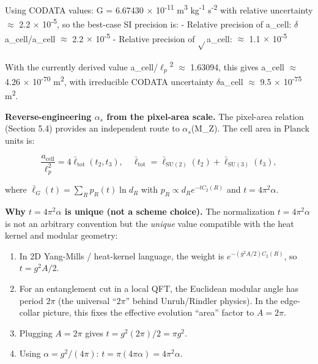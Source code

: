 \documentclass[11pt,a4paper]{article}
\theoremstyle{remark}
\begin{document}
Using CODATA values: G = 6.67430 \ensuremath{\times} 10\textsuperscript{-11} m\textsuperscript{3} kg\textsuperscript{-1} s\textsuperscript{-2} with relative uncertainty \ensuremath{\approx} 2.2 \ensuremath{\times} 10\textsuperscript{-5}, so the best-case SI precision is:
- Relative precision of a\_cell: \ensuremath{\delta}a\_cell/a\_cell \ensuremath{\approx} 2.2 \ensuremath{\times} 10\textsuperscript{-5}
- Relative precision of \ensuremath{\sqrt{}}a\_cell: \ensuremath{\approx} 1.1 \ensuremath{\times} 10\textsuperscript{-5}

With the currently derived value a\_cell/\(\ell_p\)\textsuperscript{2} \ensuremath{\approx} 1.63094, this gives a\_cell \ensuremath{\approx} 4.26 \ensuremath{\times} 10\textsuperscript{-70} m\textsuperscript{2}, with irreducible CODATA uncertainty \ensuremath{\delta}a\_cell \ensuremath{\approx} 9.5 \ensuremath{\times} 10\textsuperscript{-75} m\textsuperscript{2}.

\textbf{Reverse-engineering \(\alpha_s\) from the pixel-area scale.} The pixel-area relation
(Section 5.4) provides an independent route to \(\alpha_s\)(M\_Z). The cell area in
Planck units is:

\[
\frac{a_{\mathrm{cell}}}{\ell_p^2} = 4 \bar{\ell}_{\mathrm{tot}}(t_2, t_3),
\quad
\bar{\ell}_{\mathrm{tot}} = \bar{\ell}_{\mathrm{SU}(2)}(t_2) + \bar{\ell}_{\mathrm{SU}(3)}(t_3),
\]

where \(\bar{\ell}_G(t) = \sum_R p_R(t) \ln d_R\) with \(p_R \propto d_R e^{-t C_2(R)}\)
and \(t = 4\pi^2 \alpha\).

\textbf{Why \(t = 4\pi^2 \alpha\) is unique (not a scheme choice).} The normalization
\(t = 4\pi^2 \alpha\) is not an arbitrary convention but the \emph{unique} value
compatible with the heat kernel and modular geometry:

\begin{enumerate}
\def\labelenumi{\arabic{enumi}.}
\item
  In 2D Yang-Mills / heat-kernel language, the weight is
  \(e^{-(g^2 A/2) C_2(R)}\), so \(t = g^2 A / 2\).
\item
  For an entanglement cut in a local QFT, the Euclidean modular angle has
  period \(2\pi\) (the universal ``\(2\pi\)'' behind Unruh/Rindler physics). In
  the edge-collar picture, this fixes the effective evolution ``area'' factor
  to \(A = 2\pi\).
\item
  Plugging \(A = 2\pi\) gives \(t = g^2 (2\pi)/2 = \pi g^2\).
\item
  Using \(\alpha = g^2/(4\pi)\): \(t = \pi (4\pi \alpha) = 4\pi^2 \alpha\).
\end{enumerate}
\end{document}
